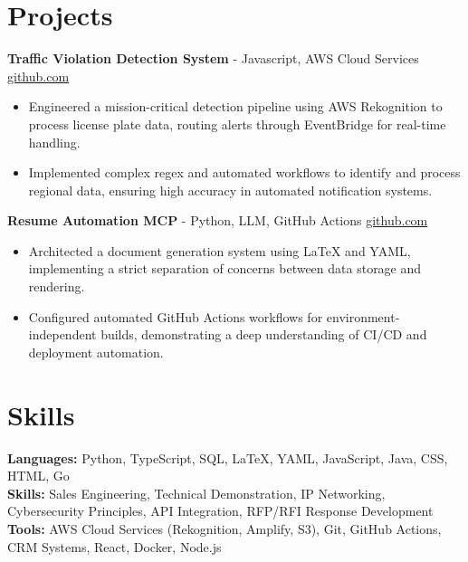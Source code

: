 \documentclass[11pt]{article}       %
\begin{document}
\vspace{-18.5pt}

\section*{Projects}

\textbf{Traffic Violation Detection System}{ - Javascript, AWS Cloud Services} \hfill \href{https://github.com/Monica20030707/AWS_rekonigition-N-read-database}{github.com} \\
\vspace{-9pt}
\begin{itemize}
  \item Engineered a mission-critical detection pipeline using AWS Rekognition to process license plate data, routing alerts through EventBridge for real-time handling.
  \item Implemented complex regex and automated workflows to identify and process regional data, ensuring high accuracy in automated notification systems.
\end{itemize}

\textbf{Resume Automation MCP}{ - Python, LLM, GitHub Actions} \hfill \href{https://github.com/Monica20030707/Tex_OrangeLeaf-mcp}{github.com} \\
\vspace{-9pt}
\begin{itemize}
  \item Architected a document generation system using LaTeX and YAML, implementing a strict separation of concerns between data storage and rendering.
  \item Configured automated GitHub Actions workflows for environment-independent builds, demonstrating a deep understanding of CI/CD and deployment automation.
\end{itemize}

\vspace{-18.5pt}

\section*{Skills}
\textbf{Languages:} Python, TypeScript, SQL, LaTeX, YAML, JavaScript, Java, CSS, HTML, Go\\
\textbf{Skills:} Sales Engineering, Technical Demonstration, IP Networking, Cybersecurity Principles, API Integration, RFP/RFI Response Development\\
\textbf{Tools:} AWS Cloud Services (Rekognition, Amplify, S3), Git, GitHub Actions, CRM Systems, React, Docker, Node.js\\

\vspace{-6.5pt}
\end{document}
